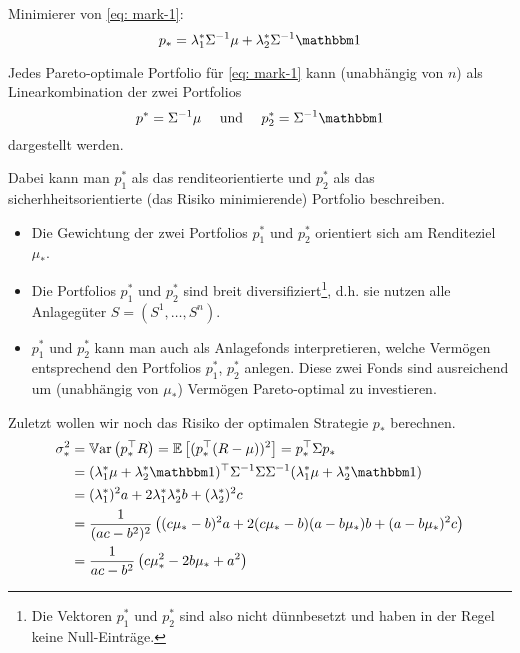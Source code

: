 Minimierer von \eqref{eq: mark-1}:
\begin{equation*}
	p_\ast = \lambda_1^\ast \Sigma^{-1} \mu + \lambda_2^\ast \Sigma^{-1} \one
\end{equation*}

\begin{korollar}
	Jedes Pareto-optimale Portfolio für \eqref{eq: mark-1} kann (unabhängig von $n$) als Linearkombination der zwei Portfolios
	\begin{equation*}
		p^\ast = \Sigma^{-1} \mu \quad \und \quad p_2^\ast = \Sigma^{-1} \one
	\end{equation*}
	dargestellt werden.
\end{korollar}
Dabei kann man $p_1^\ast$ als das renditeorientierte und $p_2^\ast$ als das sicherhheitsorientierte (das Risiko minimierende) Portfolio beschreiben.

\begin{*bemerkung}
	\begin{itemize}[nolistsep]
		\item Die Gewichtung der zwei Portfolios $p_1^\ast$ und $p_2^\ast$ orientiert sich am Renditeziel $\mu_\ast$. 
		\item Die Portfolios $p_1^\ast$ und $p_2^\ast$ sind breit diversifiziert\footnote{Die Vektoren $p_1^\ast$ und $p_2^\ast$ sind also nicht dünnbesetzt und haben in der Regel keine Null-Einträge.}, d.h. sie nutzen alle Anlagegüter $S = (S^1, \dots, S^n)$. 
		\item $p_1^\ast$ und $p_2^\ast$ kann man auch als Anlagefonds interpretieren, welche Vermögen entsprechend den Portfolios $p_1^\ast$, $p_2^\ast$ anlegen. Diese zwei Fonds sind ausreichend um (unabhängig von $\mu_\ast$) Vermögen Pareto-optimal zu investieren.
	\end{itemize}
\end{*bemerkung}

Zuletzt wollen wir noch das Risiko der optimalen Strategie $p_\ast$ berechnen.
\begin{equation*}
	\begin{aligned}
		\sigma_\ast^2 &= \Var[\trans{p_\ast} R] = \EW[(\trans{p_\ast} (R - \mu))^2] = \trans{p_\ast} \Sigma p_\ast \\
		&= \trans{(\lambda_1^\ast \mu + \lambda_2^\ast \one)} \Sigma^{-1} \Sigma \Sigma^{-1} (\lambda_1^\ast \mu + \lambda_2^\ast \one) \\
		&= (\lambda_1^\ast)^2 a + 2 \lambda_1^\ast \lambda_2^\ast b + (\lambda_2^\ast)^2 c \\
		&= \frac{1}{(ac - b^2)^2} \brackets{(c\mu_\ast - b)^2 a + 2(c \mu_\ast - b)(a - b \mu_\ast) b + (a- b \mu_\ast)^2 c} \\
		&= \frac{1}{ac - b^2} \brackets{c \mu _\ast^2 - 2b\mu_\ast + a^2}
	\end{aligned}
\end{equation*}

